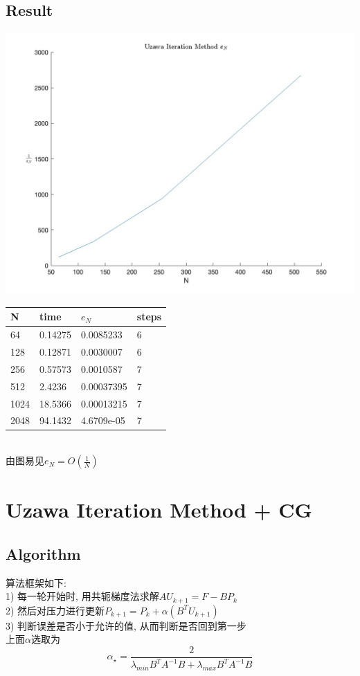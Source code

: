 \documentclass{article}
\begin{document}
\subsection{Result}
\includegraphics[scale=0.3]{image/DGS.jpg}\\
\begin{tabular}{llll}
N & time & $e_N$ & steps \\ 
\hline 
64 & 0.14275 & 0.0085233 & 6 \\ 
128 & 0.12871 & 0.0030007 & 6 \\ 
256 & 0.57573 & 0.0010587 & 7 \\ 
512 & 2.4236 & 0.00037395 & 7 \\ 
1024 & 18.5366 & 0.00013215 & 7 \\ 
2048 & 94.1432 & 4.6709e-05 & 7 \\ 
\hline 
\end{tabular}\\
由图易见$e_N=O(\frac{1}{N})$
\section{Uzawa Iteration Method + CG}
\subsection{Algorithm}
算法框架如下:\\
1) 每一轮开始时, 用共轭梯度法求解$AU_{k+1}=F-BP_k$\\
2) 然后对压力进行更新$P_{k+1}=P_k+\alpha(B^TU_{k+1})$\\
3) 判断误差是否小于允许的值, 从而判断是否回到第一步\\
上面$\alpha$选取为\\
$$
\alpha_{\star}=\frac{2}{\lambda_{min}{B^TA^{-1}B}+\lambda_{max}{B^TA^{-1}B}}
$$
\end{document}
